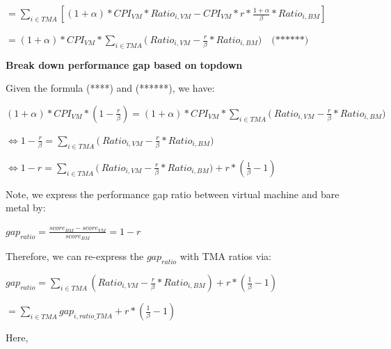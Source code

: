 \documentclass[12pt]{article}
\newcommand{\npar}[1]{#1\par}
\newcommand{\dmath}[1]{{\centering $\displaystyle #1$\par}}
\newcommand{\emptypar}{\mbox{}\par}
\newcommand{\numpara}[4]{{\hangindent=#1\relax\hangafter=1\relax
  \noindent\hspace*{\dimexpr#1-#2\relax}\makebox[#2][l]{#3}#4\par}}
\begin{document}
\dmath{=\sum\limits_{\mathit{i}\in \mathit{TMA}}{\left[ \left( 1+\alpha  \right)*\mathit{CP}{\mathit{I}}_{\mathit{VM}}*\mathit{Rati}{\mathit{o}}_{\mathit{i},\mathit{VM}}-{\mathit{CPI}}_{\mathit{VM}}*\mathit{r}*\frac{1+\alpha }{\beta }*\mathit{Rati}{\mathit{o}}_{\mathit{i},\mathit{BM}} \right]}}
\dmath{=\left( 1+\alpha  \right)*\mathit{CP}{\mathit{I}}_{\mathit{VM}}*\sum\limits_{\mathit{i}\in \mathit{TMA}}{(\ \mathit{Rati}{\mathit{o}}_{\mathit{i},\mathit{VM}}}-\frac{\mathit{r}}{\beta }*\mathit{Rati}{\mathit{o}}_{\mathit{i},\mathit{BM}})\quad\text{(******)}}
\emptypar
\numpara{18.00pt}{18.00pt}{\textbf{(3)}}{\textbf{Break down performance gap based on }\textbf{topdown}}
\npar{\hspace*{9.60pt}Given the formula (****) and (******), we have:}
\dmath{\left( 1+\alpha  \right)*\mathit{CP}{\mathit{I}}_{\mathit{VM}}*\left( 1-\frac{\mathit{r}}{\beta } \right)=\left( 1+\alpha  \right)*\mathit{CP}{\mathit{I}}_{\mathit{VM}}*\sum\limits_{\mathit{i}\in \mathit{TMA}}{(\ \mathit{Rati}{\mathit{o}}_{\mathit{i},\mathit{VM}}}-\frac{\mathit{r}}{\beta }*\mathit{Rati}{\mathit{o}}_{\mathit{i},\mathit{BM}})}
\dmath{\Leftrightarrow 1-\frac{\mathit{r}}{\beta }=\sum\limits_{\mathit{i}\in \mathit{TMA}}{(\ \mathit{Rati}{\mathit{o}}_{\mathit{i},\mathit{VM}}}-\frac{\mathit{r}}{\beta }*\mathit{Rati}{\mathit{o}}_{\mathit{i},\mathit{BM}})}
\dmath{\Leftrightarrow 1-\mathit{r}=\sum\limits_{\mathit{i}\in \mathit{TMA}}{(\ \mathit{Rati}{\mathit{o}}_{\mathit{i},\mathit{VM}}}-\frac{\mathit{r}}{\beta }*\mathit{Rati}{\mathit{o}}_{\mathit{i},\mathit{BM}})+\mathit{r}*(\frac{1}{\beta }-1)}
\emptypar
\emptypar
\emptypar
\emptypar
\npar{\hspace*{4\fontdimen2\font}Note, we express the performance gap ratio between virtual machine and bare metal by:}
\dmath{\mathit{ga}{\mathit{p}}_{\mathit{ratio}}=\frac{\mathit{scor}{\mathit{e}}_{\mathit{BM}}-\mathit{scor}{\mathit{e}}_{\mathit{VM}}}{\mathit{scor}{\mathit{e}}_{\mathit{BM}}}=1-\mathit{r}}
\npar{\hspace*{4\fontdimen2\font}Therefore, we can re-express the $\mathit{ga}{\mathit{p}}_{\mathit{ratio}}$ with TMA ratios via:}
\dmath{\mathit{ga}{\mathit{p}}_{\mathit{ratio}}=\sum\limits_{\mathit{i}\in \mathit{TMA}}{\left( \mathit{Rati}{\mathit{o}}_{\mathit{i},\mathit{VM}}-\frac{\mathit{r}}{\beta }*\mathit{Rati}{\mathit{o}}_{\mathit{i},\mathit{BM}} \right)}+\mathit{r}*(\frac{1}{\beta }-1)}
\dmath{=\sum\limits_{\mathit{i}\in \mathit{TMA}}{\mathit{ga}{\mathit{p}}_{\mathit{i},\mathit{ratio\_TMA}}}+\mathit{r}*(\frac{1}{\beta }-1)}
\npar{\hspace*{4\fontdimen2\font}Here,}
\end{document}
